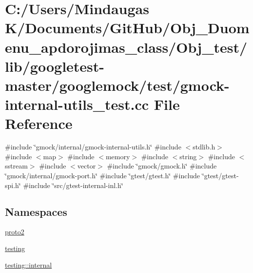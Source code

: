 \hypertarget{_obj__test_2lib_2googletest-master_2googlemock_2test_2gmock-internal-utils__test_8cc}{}\section{C\+:/\+Users/\+Mindaugas K/\+Documents/\+Git\+Hub/\+Obj\+\_\+\+Duomenu\+\_\+apdorojimas\+\_\+class/\+Obj\+\_\+test/lib/googletest-\/master/googlemock/test/gmock-\/internal-\/utils\+\_\+test.cc File Reference}
\label{_obj__test_2lib_2googletest-master_2googlemock_2test_2gmock-internal-utils__test_8cc}
{\ttfamily \#include \char`\"{}gmock/internal/gmock-\/internal-\/utils.\+h\char`\"{}}\newline
{\ttfamily \#include $<$stdlib.\+h$>$}\newline
{\ttfamily \#include $<$map$>$}\newline
{\ttfamily \#include $<$memory$>$}\newline
{\ttfamily \#include $<$string$>$}\newline
{\ttfamily \#include $<$sstream$>$}\newline
{\ttfamily \#include $<$vector$>$}\newline
{\ttfamily \#include \char`\"{}gmock/gmock.\+h\char`\"{}}\newline
{\ttfamily \#include \char`\"{}gmock/internal/gmock-\/port.\+h\char`\"{}}\newline
{\ttfamily \#include \char`\"{}gtest/gtest.\+h\char`\"{}}\newline
{\ttfamily \#include \char`\"{}gtest/gtest-\/spi.\+h\char`\"{}}\newline
{\ttfamily \#include \char`\"{}src/gtest-\/internal-\/inl.\+h\char`\"{}}\newline
\subsection*{Namespaces}
\begin{DoxyCompactItemize}
\item 
 \mbox{\hyperlink{namespaceproto2}{proto2}}
\item 
 \mbox{\hyperlink{namespacetesting}{testing}}
\item 
 \mbox{\hyperlink{namespacetesting_1_1internal}{testing\+::internal}}
\end{DoxyCompactItemize}
